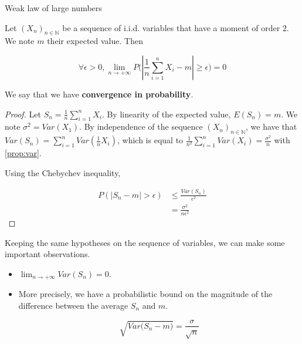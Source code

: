 \documentclass[
10pt, %
a4paper, %
oneside, %
headinclude,footinclude, %
BCOR5mm, %
]{scrartcl}
\begin{document}
\begin{theorem}{Weak law of large numbers}

    Let $(X_n)_{n\in \mathbb{N} }$ be a sequence of i.i.d. variables that have a moment of order $2$. We note $m$ their expected value. Then

    \begin{equation*}
	\forall \epsilon > 0, \lim_{n\rightarrow+\infty}P\big( |\frac{1}{n} \sum^{n}_{i=1} X_i-m|\geq \epsilon \big)= 0
    \end{equation*}

We say that we have \textbf{{convergence in probability}}.
\end{theorem}

\begin{proof}

    Let $S_n= \frac{1}{n} \sum^{n}_{i=1} X_i$. By linearity of the expected value, $E(S_n)=m$. We note $\sigma^2=Var(X_1)$. By independence of the sequence $(X_n)_{n\in \mathbb{N} }$, we have that $Var(S_n)= \sum^{n}_{i=1} Var( \frac{1}{n}  X_i)$, which is equal to $ \frac{1}{n^2} \sum^{n}_{i=1} Var(X_i)= \frac{\sigma^2}{n} $ with \ref{prop:var}.

    Using the Chebychev inequality, 

    \begin{equation*}
        \begin{aligned}
	    P(|S_n-m|>\epsilon) &\leq \frac{Var(S_n)}{\epsilon^2} \\
	    &= \frac{\sigma^2}{n\epsilon^2} 
        \end{aligned}
    \end{equation*}
    
\end{proof}

\begin{remark}
    Keeping the same hypotheses on the sequence of variables, we can make some important observations.
    \begin{itemize}
	\item $\lim_{n\rightarrow +\infty}Var(S_n)=0$.
	\item More precisely, we have a probabilistic bound on the magnitude of the difference between the average $S_n$ and $m$.

	    \begin{equation*}
		\sqrt{Var\Big( S_n-m \Big)} = \frac{\sigma}{ \sqrt{n} } 
	    \end{equation*}
    \end{itemize}
\end{remark}
\end{document}
